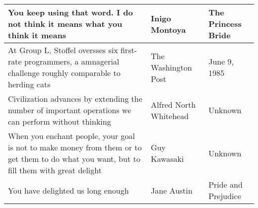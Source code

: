 \documentclass{article}
\begin{document}
    \begin{tabularx}{0.8\textwidth}{
    | >{\centering\arraybackslash}X
    | >{\centering\arraybackslash}X
    | >{\centering\arraybackslash}X |}
    \hline

    You keep using that word. I do not think it means what you think it means
    & Inigo Montoya
    & The Princess Bride \\

    \hline

    At Group L, Stoffel oversses six first-rate programmers, a amnagerial challenge roughly comparable to herding cats
    & The Washington Post
    & June 9, 1985 \\

    \hline

    Civilization advances by extending the number of important operations we can perform without thinking
    & Alfred North Whitehead
    & Unknown \\

    \hline

    When you enchant people, your goal is not to make money from them or to get them to do what you want, but to fill them with great delight
    & Guy Kawasaki
    & Unknown \\

    \hline

    You have delighted us long enough
    & Jane Austin
    & Pride and Prejudice \\

    \hline
    \end{tabularx}
\end{document}

